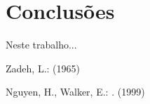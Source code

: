 \documentclass{llncs}
\begin{document}

\section{Conclusões}
Neste trabalho...

%

\begin{thebibliography}{1}
Zadeh, L.:
 (1965)

Nguyen, H., Walker, E.:
.
 (1999)
\end{thebibliography}
\end{document}
